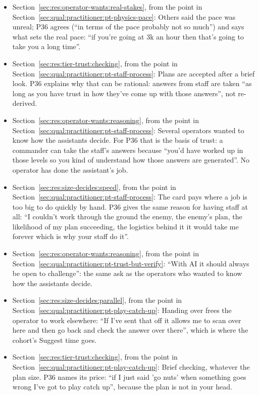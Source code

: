 \begin{itemize}[leftmargin=1.2em,itemsep=1pt]
\item Section~\ref{sec:res:operator-wants:real-stakes}, from the point in Section~\ref{sec:qual:practitioner:pt-physics-pace}: Others said the pace was unreal; P36 agrees (``in terms of the pace probably not so much'') and says what sets the real pace: ``if you're going at 3k an hour then that's going to take you a long time''.
\item Section~\ref{sec:res:tier-trust:checking}, from the point in Section~\ref{sec:qual:practitioner:pt-staff-process}: Plans are accepted after a brief look. P36 explains why that can be rational: answers from staff are taken ``as long as you have trust in how they've come up with those answers'', not re-derived.
\item Section~\ref{sec:res:operator-wants:reasoning}, from the point in Section~\ref{sec:qual:practitioner:pt-staff-process}: Several operators wanted to know how the assistants decide. For P36 that is the basis of trust: a commander can take the staff's answers because ``you'd have worked up in those levels so you kind of understand how those answers are generated''. No operator has done the assistant's job.
\item Section~\ref{sec:res:size-decides:speed}, from the point in Section~\ref{sec:qual:practitioner:pt-staff-process}: The card pays where a job is too big to do quickly by hand. P36 gives the same reason for having staff at all: ``I couldn't work through the ground the enemy, the enemy's plan, the likelihood of my plan succeeding, the logistics behind it it would take me forever which is why your staff do it''.
\item Section~\ref{sec:res:operator-wants:reasoning}, from the point in Section~\ref{sec:qual:practitioner:pt-trust-but-verify}: ``With AI it should always be open to challenge'': the same ask as the operators who wanted to know how the assistants decide.
\item Section~\ref{sec:res:size-decides:parallel}, from the point in Section~\ref{sec:qual:practitioner:pt-play-catch-up}: Handing over frees the operator to work elsewhere: ``If I've sent that off it allows me to scan over here and then go back and check the answer over there'', which is where the cohort's Suggest time goes.
\item Section~\ref{sec:res:tier-trust:checking}, from the point in Section~\ref{sec:qual:practitioner:pt-play-catch-up}: Brief checking, whatever the plan size. P36 names its price: ``if I just said 'go nuts' when something goes wrong I've got to play catch up'', because the plan is not in your head.

\end{itemize}
